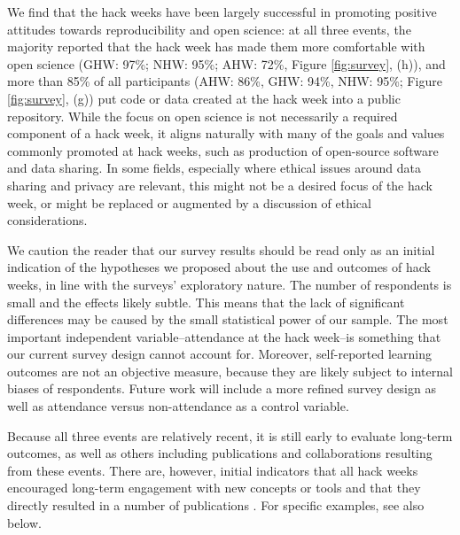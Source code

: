 We find that the hack weeks have been largely successful in promoting positive attitudes towards reproducibility and open science: at all three events, the majority reported that the hack week has made them more comfortable with open science  (GHW: 97\%; NHW: 95\%; AHW: 72\%, Figure \ref{fig:survey}, (h)), and more than 85\% of all participants (AHW: 86\%, GHW: 94\%, NHW: 95\%; Figure \ref{fig:survey}, (g)) put code or data created at the hack week into a public repository.
While the focus on open science is not necessarily a required component of a hack week, it aligns naturally with many of the goals and values commonly promoted at hack weeks, such as production of open-source software and data sharing. In some fields, especially where ethical issues around data sharing and privacy are relevant, this might not be a desired focus of the hack week, or might be replaced or augmented by a discussion of ethical considerations.

We caution the reader that our survey results should be read only as an initial indication of the hypotheses we proposed about the use and outcomes of hack weeks, in line with the surveys' exploratory nature. The number of respondents is small and the effects likely subtle. This means that the lack of significant differences may be caused by the small statistical power of our sample. The most important independent variable--attendance at the hack week--is something that our current survey design cannot account for. Moreover, self-reported learning outcomes are not an objective measure, because they are likely subject to internal biases of respondents. Future work will include a more refined survey design as well as attendance versus non-attendance as a control variable.

Because all three events are relatively recent, it is still early to evaluate long-term outcomes, as well as others including publications and collaborations resulting from these events.
There are, however, initial indicators that all hack weeks encouraged long-term engagement with new concepts or tools and that they directly resulted in a number of publications \cite{gullysantiago2015,faria2016,keshavan2017,leonard2017,jordan2017,peterson2017,hahn2017,pricewhelan2017}. For specific examples, see also below.


